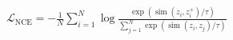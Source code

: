 $\mathcal{L}_{\mathrm{NCE}}=-\frac{1}{N}\sum_{i=1}^{N}\log\frac{\exp\left(\operatorname{sim}(z_i,z_i^+)/\tau\right)}{\sum_{j=1}^{N}\exp\left(\operatorname{sim}(z_i,z_j)/\tau\right)}$

